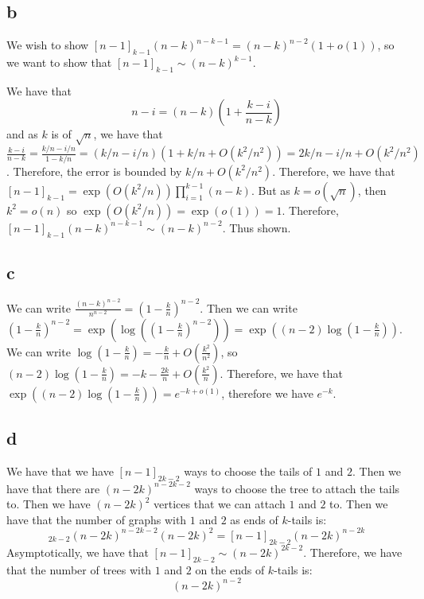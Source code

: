 \documentclass[]{article}
\begin{document}
\subsection{b}
We wish to show $[n - 1]_{k - 1}(n - k)^{n - k - 1} = (n - k)^{n - 2}( 1 + o(1))$, so we want to show that $[n - 1]_{k - 1} \sim (n - k)^{k - 1}$.

We have that 
\begin{equation}
	n - i = (n - k) ( 1 + \frac{k - i}{n - k})
\end{equation}
and as $k$ is of $\sqrt n$, we have that $\frac{k - i}{n - k} = \frac{k/n - i/n}{1 - k/n} = (k/n - i/n)( 1 + k/n + O(k^2/n^2)) = 2k/n - i/n + O(k^2/n^2)$. Therefore, the error is bounded by $k/n + O(k^2/n^2)$. Therefore, we have that $[n - 1]_{k - 1} = \exp(O(k^2/n)) \prod_{i = 1}^{k - 1}(n - k)$. But as $k = o(\sqrt{n})$, then $k^2 = o(n)$ so $\exp(O(k^2/n))  = \exp(o(1)) = 1$. Therefore, $[n - 1]_{k - 1}(n - k)^{n - k - 1}  \sim (n - k)^{n - 2}$. Thus shown. 

\subsection{c}
We can write $\frac{(n - k)^{n - 2}}{n^{n - 2}} = (1 - \frac{k}{n})^{n - 2}$. Then we can write $(1 - \frac{k}{n})^{n - 2} = \exp(\log((1 - \frac{k}{n})^{n - 2})) = \exp((n - 2) \log( 1 - \frac{k}{n}))$. We can write $\log( 1 - \frac{k}{n}) = - \frac{k}{n} + O(\frac{k^2}{n^2})$, so $(n -2)\log( 1 - \frac{k}{n}) = - k - \frac{2k}{n} + O(\frac{k^2}{n})$. Therefore, we have that $\exp((n - 2) \log( 1 - \frac{k}{n})) = e^{-k + o(1)}$, therefore we have $e^{-k}$. 

\subsection{d}

We have that we have $[n - 1]_{2k - 2}$ ways to choose the tails of $1$ and $2$. Then we have that there are $(n- 2k)^{n - 2k - 2}$ ways to choose the tree to attach the tails to. Then we have $(n - 2k)^2$ vertices that we can attach $1 $ and $2$ to. Then we have that the number of graphs with $1$ and $2$ as ends of $k$-tails is:
\begin{equation}
	[n - 1]_{2k - 2} (n - 2k)^{n - 2k - 2}(n - 2k)^2 = [n - 1]_{2k - 2} (n - 2k)^{n - 2k}
\end{equation}
Asymptotically, we have that $[n - 1]_{2k - 2} \sim (n - 2k)^{2k - 2}$. Therefore, we have that the number of trees with $1$ and $2$ on the ends of $k$-tails is:
\begin{equation}
	(n - 2k)^{n - 2}
\end{equation}
\end{document}
